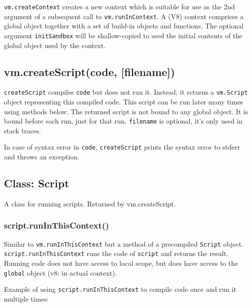 \texttt{vm.createContext} creates a new context which is suitable for
use as the 2nd argument of a subsequent call to
\texttt{vm.runInContext}. A (V8) context comprises a global object
together with a set of build-in objects and functions. The optional
argument \texttt{initSandbox} will be shallow-copied to seed the initial
contents of the global object used by the context.

\subsection{vm.createScript(code, {[}filename{]})}

\texttt{createScript} compiles \texttt{code} but does not run it.
Instead, it returns a \texttt{vm.Script} object representing this
compiled code. This script can be run later many times using methods
below. The returned script is not bound to any global object. It is
bound before each run, just for that run. \texttt{filename} is optional,
it's only used in stack traces.

In case of syntax error in \texttt{code}, \texttt{createScript} prints
the syntax error to stderr and throws an exception.

\subsection{Class: Script}

A class for running scripts. Returned by vm.createScript.

\subsubsection{script.runInThisContext()}

Similar to \texttt{vm.runInThisContext} but a method of a precompiled
\texttt{Script} object. \texttt{script.runInThisContext} runs the code
of \texttt{script} and returns the result. Running code does not have
access to local scope, but does have access to the \texttt{global}
object (v8: in actual context).

Example of using \texttt{script.runInThisContext} to compile code once
and run it multiple times:

